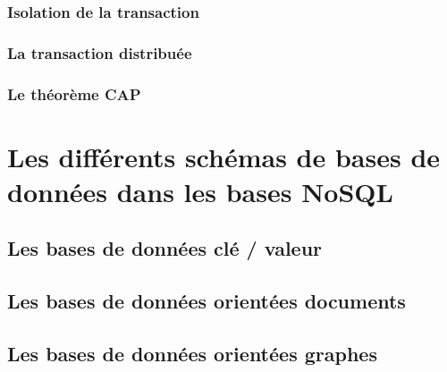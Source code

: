 \documentclass[12pt,titlepage,a4paper]{report}
\begin{document}
			\subsection{Isolation de la transaction}
			\subsection{La transaction distribuée}
			\subsection{Le théorème CAP}

	\chapter{Les différents schémas de bases de données dans les bases NoSQL}
	\minitoc

		\section{Les bases de données clé / valeur}
			

		\section{Les bases de données orientées documents}
		\section{Les bases de données orientées graphes}

	
	
\end{document}

